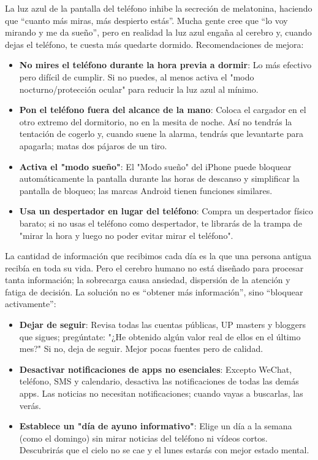 
La luz azul de la pantalla del teléfono inhibe la secreción de melatonina, haciendo que “cuanto más miras, más despierto estás”. Mucha gente cree que “lo voy mirando y me da sueño”, pero en realidad la luz azul engaña al cerebro y, cuando dejas el teléfono, te cuesta más quedarte dormido. Recomendaciones de mejora:

\begin{itemize}
  \item \textbf{No mires el teléfono durante la hora previa a dormir}: Lo más efectivo pero difícil de cumplir. Si no puedes, al menos activa el "modo nocturno/protección ocular" para reducir la luz azul al mínimo.
  \item \textbf{Pon el teléfono fuera del alcance de la mano}: Coloca el cargador en el otro extremo del dormitorio, no en la mesita de noche. Así no tendrás la tentación de cogerlo y, cuando suene la alarma, tendrás que levantarte para apagarla; matas dos pájaros de un tiro.
  \item \textbf{Activa el "modo sueño"}: El "Modo sueño" del iPhone puede bloquear automáticamente la pantalla durante las horas de descanso y simplificar la pantalla de bloqueo; las marcas Android tienen funciones similares.
  \item \textbf{Usa un despertador en lugar del teléfono}: Compra un despertador físico barato; si no usas el teléfono como despertador, te librarás de la trampa de "mirar la hora y luego no poder evitar mirar el teléfono".
\end{itemize}


La cantidad de información que recibimos cada día es la que una persona antigua recibía en toda su vida. Pero el cerebro humano no está diseñado para procesar tanta información; la sobrecarga causa ansiedad, dispersión de la atención y fatiga de decisión. La solución no es “obtener más información”, sino “bloquear activamente”:

\begin{itemize}
  \item \textbf{Dejar de seguir}: Revisa todas las cuentas públicas, UP masters y bloggers que sigues; pregúntate: "¿He obtenido algún valor real de ellos en el último mes?" Si no, deja de seguir. Mejor pocas fuentes pero de calidad.
  \item \textbf{Desactivar notificaciones de apps no esenciales}: Excepto WeChat, teléfono, SMS y calendario, desactiva las notificaciones de todas las demás apps. Las noticias no necesitan notificaciones; cuando vayas a buscarlas, las verás.
  \item \textbf{Establece un "día de ayuno informativo"}: Elige un día a la semana (como el domingo) sin mirar noticias del teléfono ni vídeos cortos. Descubrirás que el cielo no se cae y el lunes estarás con mejor estado mental.
\end{itemize}

